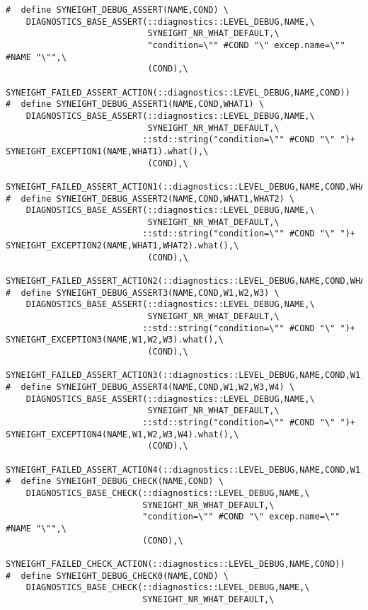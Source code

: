 \begin{verbatim}
#  define SYNEIGHT_DEBUG_ASSERT(NAME,COND) \
    DIAGNOSTICS_BASE_ASSERT(::diagnostics::LEVEL_DEBUG,NAME,\
                            SYNEIGHT_NR_WHAT_DEFAULT,\
                            "condition=\"" #COND "\" excep.name=\"" #NAME "\"",\
                            (COND),\
                            SYNEIGHT_FAILED_ASSERT_ACTION(::diagnostics::LEVEL_DEBUG,NAME,COND))
#  define SYNEIGHT_DEBUG_ASSERT1(NAME,COND,WHAT1) \
    DIAGNOSTICS_BASE_ASSERT(::diagnostics::LEVEL_DEBUG,NAME,\
                            SYNEIGHT_NR_WHAT_DEFAULT,\
                           ::std::string("condition=\"" #COND "\" ")+ SYNEIGHT_EXCEPTION1(NAME,WHAT1).what(),\
                            (COND),\
                            SYNEIGHT_FAILED_ASSERT_ACTION1(::diagnostics::LEVEL_DEBUG,NAME,COND,WHAT1))
#  define SYNEIGHT_DEBUG_ASSERT2(NAME,COND,WHAT1,WHAT2) \
    DIAGNOSTICS_BASE_ASSERT(::diagnostics::LEVEL_DEBUG,NAME,\
                            SYNEIGHT_NR_WHAT_DEFAULT,\
                           ::std::string("condition=\"" #COND "\" ")+ SYNEIGHT_EXCEPTION2(NAME,WHAT1,WHAT2).what(),\
                            (COND),\
                            SYNEIGHT_FAILED_ASSERT_ACTION2(::diagnostics::LEVEL_DEBUG,NAME,COND,WHAT1,WHAT2))
#  define SYNEIGHT_DEBUG_ASSERT3(NAME,COND,W1,W2,W3) \
    DIAGNOSTICS_BASE_ASSERT(::diagnostics::LEVEL_DEBUG,NAME,\
                            SYNEIGHT_NR_WHAT_DEFAULT,\
                           ::std::string("condition=\"" #COND "\" ")+ SYNEIGHT_EXCEPTION3(NAME,W1,W2,W3).what(),\
                            (COND),\
                            SYNEIGHT_FAILED_ASSERT_ACTION3(::diagnostics::LEVEL_DEBUG,NAME,COND,W1,W2,W3))
#  define SYNEIGHT_DEBUG_ASSERT4(NAME,COND,W1,W2,W3,W4) \
    DIAGNOSTICS_BASE_ASSERT(::diagnostics::LEVEL_DEBUG,NAME,\
                            SYNEIGHT_NR_WHAT_DEFAULT,\
                           ::std::string("condition=\"" #COND "\" ")+ SYNEIGHT_EXCEPTION4(NAME,W1,W2,W3,W4).what(),\
                            (COND),\
                            SYNEIGHT_FAILED_ASSERT_ACTION4(::diagnostics::LEVEL_DEBUG,NAME,COND,W1,W2,W3,W4))
#  define SYNEIGHT_DEBUG_CHECK(NAME,COND) \
    DIAGNOSTICS_BASE_CHECK(::diagnostics::LEVEL_DEBUG,NAME,\
                           SYNEIGHT_NR_WHAT_DEFAULT,\
                           "condition=\"" #COND "\" excep.name=\"" #NAME "\"",\
                           (COND),\
                           SYNEIGHT_FAILED_CHECK_ACTION(::diagnostics::LEVEL_DEBUG,NAME,COND))
#  define SYNEIGHT_DEBUG_CHECK0(NAME,COND) \
    DIAGNOSTICS_BASE_CHECK(::diagnostics::LEVEL_DEBUG,NAME,\
                           SYNEIGHT_NR_WHAT_DEFAULT,\

\end{verbatim}
